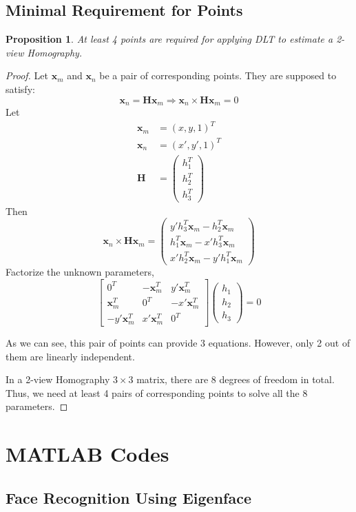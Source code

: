 \documentclass{article}
\newcommand*{\xm}{\mathbf{x}_m}
\newcommand*{\xn}{\mathbf{x}_n}
\newcommand*{\HH}{\mathbf{H}}
\theoremstyle{plain} \newtheorem{prop}{Proposition}
\begin{document}
\subsection{Minimal Requirement for Points}
\begin{prop}
At least 4 points are required for applying DLT to estimate a 2-view Homography.
\end{prop}
\begin{proof}
Let $\xm$ and $\xn$ be a pair of corresponding points. They are supposed to satisfy:
\[
\xn = \HH\xm \Rightarrow \xn\times\HH\xm = 0
\]
Let
\begin{align*}
\xm &= (x, y, 1)^T \\
\xn &= (x', y', 1)^T \\
\HH & = \begin{pmatrix}
h_1^T \\
h_2^T \\
h_3^T
\end{pmatrix}
\end{align*}
Then
\[
\xn\times\HH\xm = \begin{pmatrix}
y'h_3^T\xm - h_2^T\xm \\
h_1^T\xm - x'h_3^T\xm \\
x'h_2^T\xm - y'h_1^T\xm
\end{pmatrix}
\]
Factorize the unknown parameters,
\[
\begin{bmatrix}
0^T & -\xm^T & y'\xm^T \\
\xm^T & 0^T & -x'\xm^T \\
-y'\xm^T & x'\xm^T & 0^T
\end{bmatrix}
\begin{pmatrix}
h_1 \\
h_2 \\
h_3
\end{pmatrix} = 0
\]

As we can see, this pair of points can provide 3 equations. However, only 2 out of them are linearly independent.

In a 2-view Homography $3\times3$ matrix, there are 8 degrees of freedom in total. Thus, we need at least 4 pairs of corresponding points to solve all the 8 parameters.
\end{proof}

\appendix
\section{MATLAB Codes}
\subsection{Face Recognition Using Eigenface}
\end{document}
